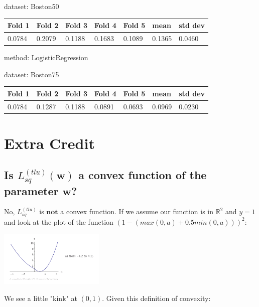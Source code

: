 \documentclass{article}
\begin{document}
\noindent dataset: Boston50

\begin{center}
	\begin{tabular}  { | l | l | l | l | l | l | l | }
	\hline
	Fold 1 & Fold 2 & Fold 3 & Fold 4 & Fold 5 & mean & std dev\\ \hline
	0.0784 & 0.2079 & 0.1188 & 0.1683 & 0.1089 & 0.1365 & 0.0460\\
	\hline
	\end{tabular}
\end{center}
\noindent method: LogisticRegression

\noindent dataset: Boston75

\begin{center}
	\begin{tabular}  { | l | l | l | l | l | l | l | }
	\hline
	Fold 1 & Fold 2 & Fold 3 & Fold 4 & Fold 5 & mean & std dev\\ \hline
	0.0784 & 0.1287 & 0.1188 & 0.0891 & 0.0693 & 0.0969 & 0.0230\\
	\hline
	\end{tabular}
\end{center}



\section{Extra Credit}

\subsection{Is $L_{sq}^{(tlu)}(\mathbf{w})$ a convex function of the parameter $\mathbf{w}$?}

No, $L_{sq}^{(tlu)}$ is $\textbf{not}$ a convex function.  If we assume our function is in $\mathbb{R}^2$ and $y=1$ and look at the plot of the function $(1 - ( max(0, a) + 0.5 min(0, a)))^2$:


\begin{center}
  \includegraphics[width=50mm, scale=0.5]{plot1.png}
\end{center}

We see a little "kink" at $(0, 1)$.  Given this definition of convexity:
\end{document}
